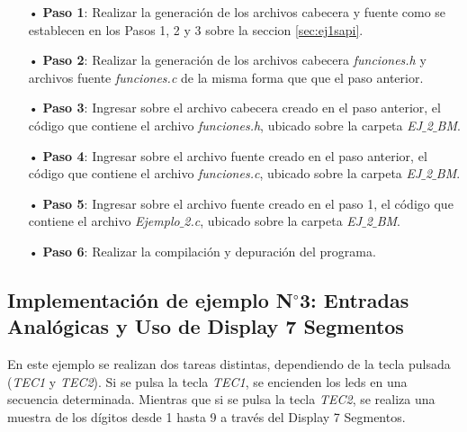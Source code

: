 \documentclass[12pt,letterpaper]{article}
\begin{document}
\begin{enumerate}
\item[•]\textbf{Paso 1}: Realizar la generación de los archivos cabecera y fuente como se establecen en los Pasos 1, 2 y 3 sobre la seccion \ref{sec:ej1sapi}.

\item[•]\textbf{Paso 2}: Realizar la generación de los archivos cabecera \textit{funciones.h} y archivos fuente \textit{funciones.c} de la misma forma que que el paso anterior.

\item[•]\textbf{Paso 3}: Ingresar sobre el archivo cabecera creado en el paso anterior, el código que contiene el archivo \textit{funciones.h}, ubicado sobre la carpeta \textit{EJ$\_$2$\_$BM}.

\item[•]\textbf{Paso 4}: Ingresar sobre el archivo fuente creado en el paso anterior, el código que contiene el archivo \textit{funciones.c}, ubicado sobre la carpeta \textit{EJ$\_$2$\_$BM}.

\item[•]\textbf{Paso 5}: Ingresar sobre el archivo fuente creado en el paso 1, el código que contiene el archivo \textit{Ejemplo$\_$2.c}, ubicado sobre la carpeta \textit{EJ$\_$2$\_$BM}.

\item[•]\textbf{Paso 6}: Realizar la compilación y depuración del programa.
\end{enumerate}



\subsection{Implementación de ejemplo N$^{\circ}$3: Entradas Analógicas y Uso de Display 7 Segmentos}\label{sec:ej3sapi}
En este ejemplo se realizan dos tareas distintas, dependiendo de la tecla pulsada (\textit{TEC1} y \textit{TEC2}). Si se pulsa la tecla \textit{TEC1}, se encienden los leds en una secuencia determinada. Mientras que si se pulsa la tecla \textit{TEC2}, se realiza una muestra de los dígitos desde 1 hasta 9 a través del Display 7 Segmentos. 
 \\
 
\end{document}
